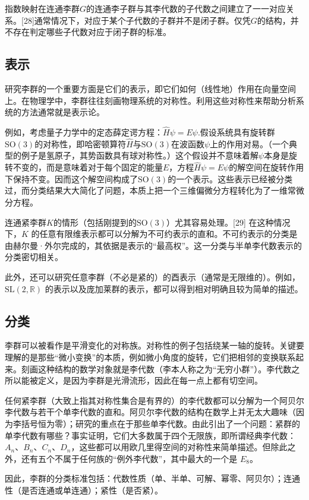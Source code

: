指数映射在连通李群$G$的连通李子群与其李代数的子代数之间建立了一一对应关系。[28]通常情况下，对应于某个子代数的子群并不是闭子群。仅凭$G$的结构，并不存在判定哪些子代数对应于闭子群的标准。
\subsection{表示}
研究李群的一个重要方面是它们的表示，即它们如何（线性地）作用在向量空间上。在物理学中，李群往往刻画物理系统的对称性。利用这些对称性来帮助分析系统的方法通常就是表示论。

例如，考虑量子力学中的定态薛定谔方程：$\hat{H}\psi = E\psi$.假设系统具有旋转群$\mathrm{SO}(3)$的对称性，即哈密顿算符$\hat{H}$与$\mathrm{SO}(3)$在波函数$\psi$上的作用对易。（一个典型的例子是氢原子，其势函数具有球对称性。）这个假设并不意味着解$\psi$本身是旋转不变的，而是意味着对于每个固定的能量$E$，方程$\hat{H}\psi = E\psi$的解空间在旋转作用下保持不变。因而这个解空间构成了$\mathrm{SO}(3)$的一个表示。这些表示已经被分类过，而分类结果大大简化了问题，本质上把一个三维偏微分方程转化为了一维常微分方程。

连通紧李群$K$的情形（包括刚提到的$\mathrm{SO}(3)$）尤其容易处理。[29] 在这种情况下，$K$ 的任意有限维表示都可以分解为不可约表示的直和。不可约表示的分类是由赫尔曼·外尔完成的，其依据是表示的“最高权”。这一分类与半单李代数表示的分类密切相关。

此外，还可以研究任意李群（不必是紧的）的酉表示（通常是无限维的）。例如，$\mathrm{SL}(2,\mathbb{R})$ 的表示以及庞加莱群的表示，都可以得到相对明确且较为简单的描述。
\subsection{分类}
李群可以被看作是平滑变化的对称族。对称性的例子包括绕某一轴的旋转。关键要理解的是那些“微小变换”的本质，例如微小角度的旋转，它们把相邻的变换联系起来。刻画这种结构的数学对象就是李代数（李本人称之为“无穷小群”）。李代数之所以能被定义，是因为李群是光滑流形，因此在每一点上都有切空间。

任何紧李群（大致上指其对称性集合是有界的）的李代数都可以分解为一个阿贝尔李代数与若干个单李代数的直和。阿贝尔李代数的结构在数学上并无太大趣味（因为李括号恒为零）；研究的重点在于那些单李代数。由此引出了一个问题：紧群的单李代数有哪些？事实证明，它们大多数属于四个无限族，即所谓经典李代数：$A_n$、$B_n$、$C_n$、$D_n$，这些都可以用欧几里得空间的对称性来简单描述。但除此之外，还有五个不属于任何族的“例外李代数”，其中最大的一个是 $E_8$。

因此，李群的分类标准包括：代数性质（单、半单、可解、幂零、阿贝尔）；连通性（是否连通或单连通）；紧性（是否紧）。

